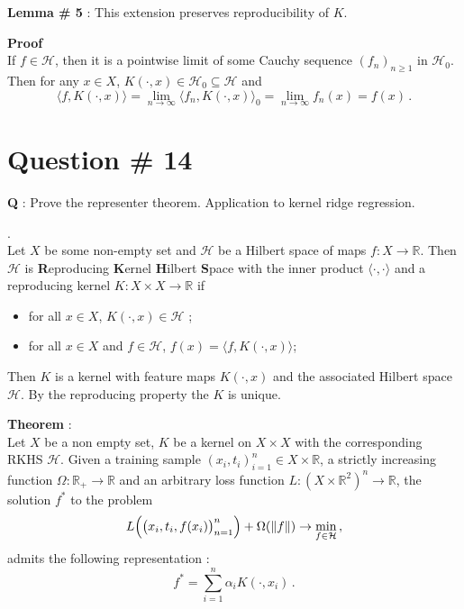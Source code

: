 \documentclass[a4paper]{article}
\newcommand{\Real}{\mathbb{R}}
\newcommand{\Hcal}{\mathcal{H}}
\begin{document}
\noindent\textbf{Lemma \# 5} : This extension preserves reproducibility of $K$.

\noindent\textbf{Proof} \hfill \\
If $f\in \Hcal$, then it is a pointwise limit of some Cauchy sequence $(f_n)_{n\geq1}$
in $\Hcal_0$. Then for any $x\in X$, $K(\cdot, x)\in \Hcal_0 \subseteq \Hcal$ and
\[
\langle f, K(\cdot, x)\rangle
= \lim_{n\to\infty} \langle f_n, K(\cdot, x)\rangle_0
= \lim_{n\to\infty} f_n(x)
= f(x)\,.
\]


\clearpage

\section[Representer]{Question \# 14} %
\label{sec:question_14}
\textbf{\large \textbf{Q}} : Prove the representer theorem. Application to kernel
ridge regression.

 .\hfill\\
Let $X$ be some non-empty set and $\Hcal$ be a Hilbert space of maps $f:X\to\Real$.
Then $\Hcal$ is \textbf{R}eproducing \textbf{K}ernel \textbf{H}ilbert \textbf{S}pace
with the inner product $\langle\cdot, \cdot\rangle$ and a reproducing kernel $K: X\times X\to \Real$
if \begin{itemize}
	\item for all $x\in X$, $K(\cdot,x) \in \Hcal$ ;
	\item for all $x\in X$ and $f\in \Hcal$, $f(x) = \langle f, K(\cdot, x) \rangle$;
\end{itemize}
Then $K$ is a kernel with feature maps $K(\cdot,x)$ and the associated Hilbert space
$\Hcal$. By the reproducing property the $K$ is unique.

\noindent\textbf{Theorem} : \hfill\\
Let $X$ be a non empty set, $K$ be a kernel on $X\times X$ with the corresponding
RKHS $\Hcal$. Given a training sample $(x_i, t_i)_{i=1}^n \in X \times \Real$, a
strictly increasing function $\Omega:\Real_+\to\Real$ and an arbitrary loss function
$L:( X\times \Real^2)^n \to \Real$, the solution $f^*$ to the problem
\[
L\Bigl( \bigl(x_i,t_i,f(x_i)\bigr)_{n=1}^n \Bigr) + \Omega(\|f\|) \to \min_{f\in \Hcal}\,,
\]
admits the following representation :
\[ f^* = \sum_{i=1}^n \alpha_i K( \cdot, x_i ) \,. \]
\end{document}
